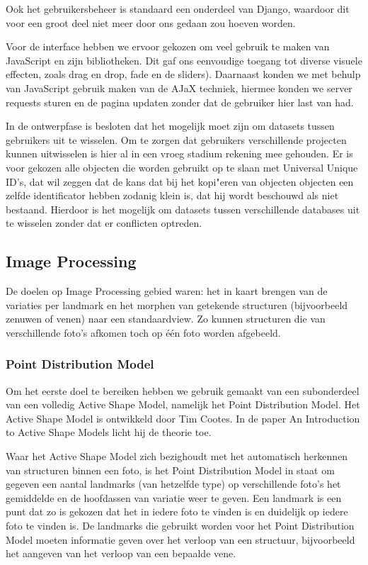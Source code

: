 Ook het gebruikers\-beheer is standaard een onderdeel van Django, waardoor dit voor een groot deel niet meer door ons gedaan zou hoeven worden.

Voor de interface hebben we ervoor gekozen om veel gebruik te maken van JavaScript en zijn bibliotheken. Dit gaf ons eenvoudige toegang tot diverse visuele effecten, zoals drag en drop, fade en de sliders). Daarnaast konden we met behulp van JavaScript gebruik maken van de AJaX techniek, hiermee konden we server requests sturen en de pagina updaten zonder dat de gebruiker hier last van had.

In de ontwerpfase is besloten dat het mogelijk moet zijn om datasets tussen gebruikers uit te wisselen. Om te zorgen dat gebruikers verschillende projecten kunnen uitwisselen is hier al in een vroeg stadium rekening mee gehouden. Er is voor gekozen alle objecten die worden gebruikt op te slaan met Universal Unique ID's, dat wil zeggen dat de kans dat bij het kopi"{e}ren van objecten objecten een zelfde identificator hebben zodanig klein is, dat hij wordt beschouwd als niet bestaand. Hierdoor is het mogelijk om datasets tussen verschillende databases uit te wisselen zonder dat er conflicten optreden.

\subsection{Image Processing}
\label{aanpak_image_processing}
De doelen op Image Processing gebied waren: het in kaart brengen van de variaties per landmark en het morphen van getekende structuren (bijvoorbeeld zenuwen of venen) naar een standaardview. Zo kunnen structuren die van verschillende foto's afkomen toch op \'{e}\'{e}n foto worden afgebeeld.

\subsubsection{Point Distribution Model}
Om het eerste doel te bereiken hebben we gebruik gemaakt van een subonderdeel van een volledig Active Shape Model, namelijk het Point Distribution Model. Het Active Shape Model is ontwikkeld door Tim Cootes. In de paper An Introduction to Active Shape Models licht hij de theorie toe.\cite{introASM}

Waar het Active Shape Model zich bezighoudt met het automatisch herkennen van structuren binnen een foto, is het Point Distribution Model\cite{pdm} in staat om gegeven een aantal landmarks (van hetzelfde type) op verschillende foto's het gemiddelde en de hoofdassen van variatie weer te geven. Een landmark is een punt dat zo is gekozen dat het in iedere foto te vinden is en duidelijk op iedere foto te vinden is. De landmarks die gebruikt worden voor het Point Distribution Model moeten informatie geven over het verloop van een structuur, bijvoorbeeld het aangeven van het verloop van een bepaalde vene.

